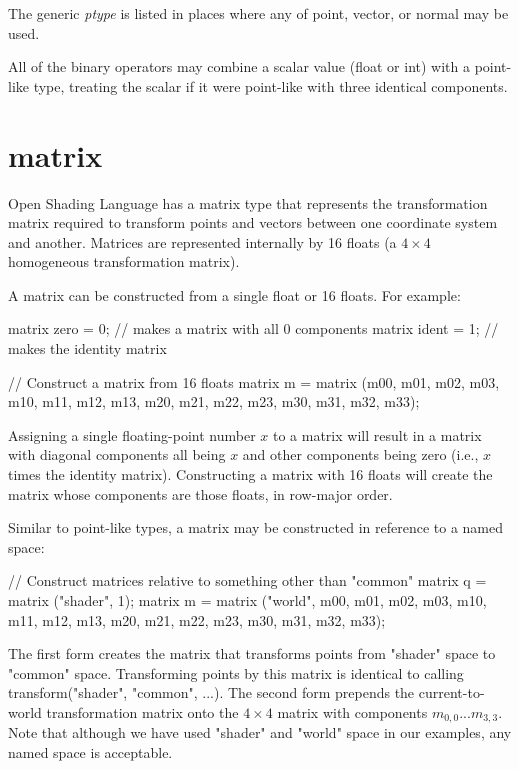 \documentclass[11pt,letterpaper]{book}
\def\langname{Open Shading Language\xspace}
\def\float{{\cf float}\xspace}
\def\inttype{{\cf int}\xspace}
\def\matrix{{\cf matrix}\xspace}
\def\normal{{\cf normal}\xspace}
\def\point{{\cf point}\xspace}
\def\vector{{\cf vector}\xspace}
\def\commonspace{{\cf "common"} space\xspace}
\def\shaderspace{{\cf "shader"} space\xspace}
\begin{document}
\noindent The generic \emph{ptype} is listed in places where any
of \point, \vector, or \normal may be used.

All of the binary operators may combine a scalar value (\float or
\inttype) with a point-like type, treating the scalar if it were
point-like with three identical components.


\section{{\cf matrix}}
\label{sec:types:matrix}
 

\langname has a \matrix type that represents the transformation matrix
required to transform points and vectors between one coordinate system
and another.  Matrices are represented internally by 16 floats (a $4
\times 4$ homogeneous transformation matrix).

A \matrix can be constructed from a single float or 16 floats.  For
example:

\begin{code}
    matrix zero = 0;   // makes a matrix with all 0 components
    matrix ident = 1;  // makes the identity matrix

    // Construct a matrix from 16 floats
    matrix m = matrix (m00, m01, m02, m03, m10, m11, m12, m13, 
                       m20, m21, m22, m23, m30, m31, m32, m33);
\end{code}

\noindent Assigning a single floating-point number $x$ to a matrix will result
in a matrix with diagonal components all being $x$ and other
components being zero (i.e., $x$ times the identity matrix).
Constructing a matrix with 16 floats will create the matrix whose
components are those floats, in row-major order.  

Similar to point-like types, a {\cf matrix} may be constructed in
reference to a named space:

\begin{code}
    // Construct matrices relative to something other than "common"
    matrix q = matrix ("shader", 1);
    matrix m = matrix ("world", m00, m01, m02, m03, m10, m11, m12, m13, 
                               m20, m21, m22, m23, m30, m31, m32, m33);
\end{code}

\noindent The first form creates the matrix that transforms points from
\shaderspace to \commonspace.  Transforming points by this matrix
is identical to calling {\cf transform("shader", "common", ...)}.
The second form prepends the current-to-world transformation matrix
onto the $4 \times 4$ matrix with components $m_{0,0} ... m_{3,3}$.
Note that although we have used {\cf "shader"} and {\cf "world"}
space in our examples, any named space is acceptable.
\end{document}
